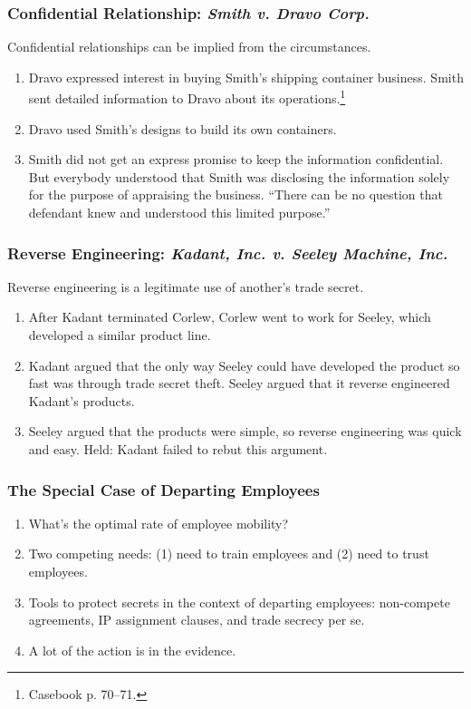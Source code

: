 \subsubsection{Confidential Relationship: \emph{Smith v. Dravo Corp.}}

Confidential relationships can be implied from the circumstances.

\begin{enumerate}
    \item Dravo expressed interest in buying Smith's shipping container 
    business. Smith sent detailed information to Dravo about its 
    operations.\footnote{Casebook p. 70--71.}
    \item Dravo used Smith's designs to build its own containers.
    \item Smith did not get an express promise to keep the information 
    confidential. But everybody understood that Smith was disclosing the 
    information solely for the purpose of appraising the business. ``There can 
    be no question that defendant knew and understood this limited purpose.''
\end{enumerate}

\subsubsection{Reverse Engineering: \emph{Kadant, Inc. v. Seeley Machine, Inc.}}

Reverse engineering is a legitimate use of another's trade secret.

\begin{enumerate}
    \item After Kadant terminated Corlew, Corlew went to work for Seeley, 
    which developed a similar product line.
    \item Kadant argued that the only way Seeley could have developed the 
    product so fast was through trade secret theft. Seeley argued that it 
    reverse engineered Kadant's products.
    \item Seeley argued that the products were simple, so reverse engineering 
    was quick and easy. Held: Kadant failed to rebut this argument.
\end{enumerate}

\subsubsection{The Special Case of Departing Employees}

\begin{enumerate}
    \item What's the optimal rate of employee mobility?
    \item Two competing needs: (1) need to train employees and (2) need to 
    trust employees.
    \item Tools to protect secrets in the context of departing employees: 
    non-compete agreements, IP assignment clauses, and trade secrecy per se.
    \item A lot of the action is in the evidence.
\end{enumerate}

